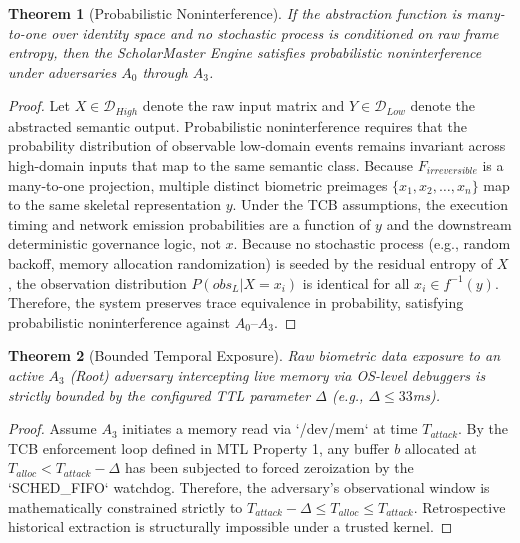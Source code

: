 \documentclass[conference]{IEEEtran}
\newtheorem{theorem}{Theorem}
\begin{document}
\begin{theorem}[Probabilistic Noninterference]
If the abstraction function is many-to-one over identity space and no stochastic process is conditioned on raw frame entropy, then the ScholarMaster Engine satisfies probabilistic noninterference under adversaries $A_0$ through $A_3$.
\end{theorem}
\begin{proof}
Let $X \in \mathcal{D}_{High}$ denote the raw input matrix and $Y \in \mathcal{D}_{Low}$ denote the abstracted semantic output. Probabilistic noninterference requires that the probability distribution of observable low-domain events remains invariant across high-domain inputs that map to the same semantic class. Because $F_{irreversible}$ is a many-to-one projection, multiple distinct biometric preimages $\{x_1, x_2, \dots, x_n\}$ map to the same skeletal representation $y$. Under the TCB assumptions, the execution timing and network emission probabilities are a function of $y$ and the downstream deterministic governance logic, not $x$. Because no stochastic process (e.g., random backoff, memory allocation randomization) is seeded by the residual entropy of $X$, the observation distribution $P(obs_L | X = x_i)$ is identical for all $x_i \in f^{-1}(y)$. Therefore, the system preserves trace equivalence in probability, satisfying probabilistic noninterference against $A_0$--$A_3$.
\end{proof}

\begin{theorem}[Bounded Temporal Exposure]
Raw biometric data exposure to an active $A_3$ (Root) adversary intercepting live memory via OS-level debuggers is strictly bounded by the configured TTL parameter $\Delta$ (e.g., $\Delta \le 33$ms).
\end{theorem}
\begin{proof}
Assume $A_3$ initiates a memory read via `/dev/mem` at time $T_{attack}$. By the TCB enforcement loop defined in MTL Property 1, any buffer $b$ allocated at $T_{alloc} < T_{attack} - \Delta$ has been subjected to forced zeroization by the `SCHED_FIFO` watchdog. Therefore, the adversary's observational window is mathematically constrained strictly to $T_{attack} - \Delta \le T_{alloc} \le T_{attack}$. Retrospective historical extraction is structurally impossible under a trusted kernel.
\end{proof}
\end{document}
